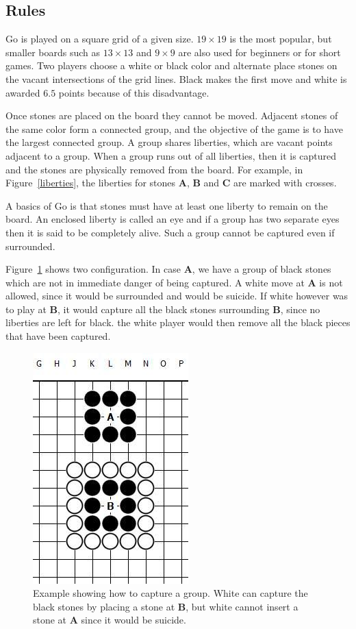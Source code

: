 \documentclass[nocopyrightspace, 10pt]{sigplanconf}
\begin{document}
\subsection{Rules}
Go is played on a square grid of a given size. $19 \times 19$ is the most popular, but smaller boards such as $13 \times 13$ and $9 \times 9$ are also used for beginners or for short games. Two players choose a white or black color and alternate place stones on the vacant intersections of the grid lines. Black makes the first move and white is awarded $6.5$ points because of this disadvantage.


Once stones are placed on the board they cannot be moved. Adjacent stones of the same color form a connected group, and the objective of the game is to have the largest connected group. A group shares liberties, which are vacant points adjacent to a group. When a group runs out of all liberties, then it is captured and the stones are physically removed from the board. For example, in Figure~\ref{liberties}, the liberties for stones \textbf{A}, \textbf{B} and \textbf{C} are marked with crosses.

A basics of Go is that stones must have at least one liberty to remain on the board. An enclosed liberty is called an eye and if a group has two separate eyes then it is said to be completely alive. Such a group cannot be captured even if surrounded.

Figure~\ref{capture} shows two configuration. In case \textbf{A}, we have a group of black stones which are not in immediate danger of being captured. A white move at \textbf{A} is not allowed, since it would be surrounded and would be suicide. If white however was to play at \textbf{B}, it would capture all the black stones surrounding \textbf{B}, since no liberties are left for black. the white player would then remove all the black pieces that have been captured.


\begin{figure} 
\begin{center}
\includegraphics[scale=0.45]{capture.jpg}
\end{center}
\caption{Example showing how to capture a group. White can capture the black stones by placing a stone at \textbf{B}, but white cannot insert a stone at \textbf{A} since it would be suicide.}
\label{capture}
\end{figure}
\end{document}
